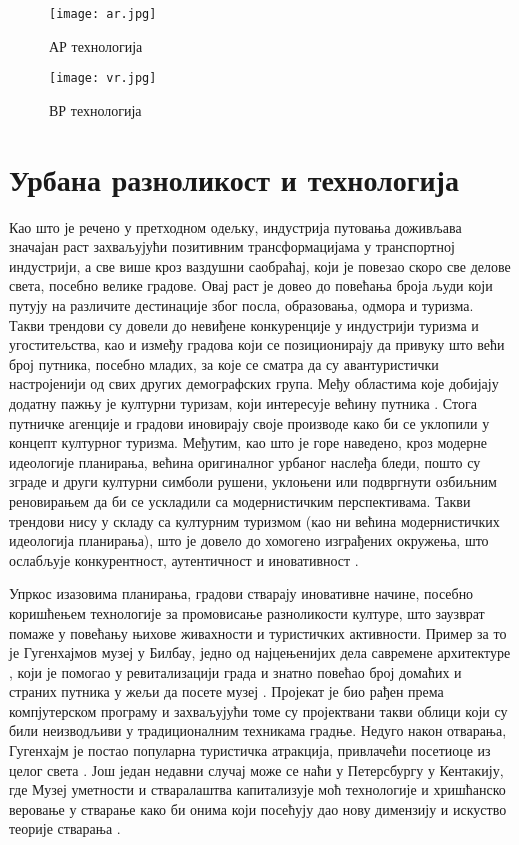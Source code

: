 \documentclass{article}
\begin{document}
\begin{figure}[H]
\centering
\texttt{[image: ar.jpg]}
\caption{АР технологија}
\end{figure}

\begin{figure}[H]
\centering
\texttt{[image: vr.jpg]}
\caption{ВР технологија}
\end{figure}

\section{Урбана разноликост и технологија}

Као што је речено у претходном одељку, индустрија путовања доживљава значајан раст захваљујући позитивним трансформацијама у транспортној индустрији, а све више кроз ваздушни саобраћај, који је повезао скоро све делове света, посебно велике градове. Овај раст је довео до повећања броја људи који путују на различите дестинације због посла, образовања, одмора и туризма. Такви трендови су довели до невиђене конкуренције у индустрији туризма и угоститељства, као и између градова који се позиционирају да привуку што већи број путника, посебно младих, за које се сматра да су авантуристички настројенији од свих других демографских група. Међу областима које добијају додатну пажњу је културни туризам, који интересује већину путника \cite{richardsg}. Стога путничке агенције и градови иновирају своје производе како би се уклопили у концепт културног туризма. Међутим, као што је горе наведено, кроз модерне идеологије планирања, већина оригиналног урбаног наслеђа бледи, пошто су зграде и други културни симболи рушени, уклоњени или подвргнути озбиљним реновирањем да би се ускладили са модернистичким перспективама. Такви трендови нису у складу са културним туризмом (као ни већина модернистичких идеологија планирања), што је довело до хомогено изграђених окружења, што ослабљује конкурентност, аутентичност и иновативност \cite{appendino}.

Упркос изазовима планирања, градови стварају иновативне начине, посебно коришћењем технологије за промовисање разноликости културе, што заузврат помаже у повећању њихове живахности и туристичких активности. Пример за то је Гугенхајмов музеј у Билбау, једно од најцењенијих дела савремене архитектуре \cite{archbilbao}, који је помогао у ревитализацији града и знатно повећао број домаћих и страних путника у жељи да посете музеј \cite{plazab}. Пројекат је био рађен према компјутерском програму и захваљујући томе су пројектвани такви облици који су били неизводљиви у традиционалним техникама градње. Недуго након отварања, Гугенхајм је постао популарна туристичка атракција, привлачећи посетиоце из целог света \cite{nytbilbao}. Још један недавни случај може се наћи у Петерсбургу у Кентакију, где Музеј уметности и стваралаштва капитализује моћ технологије и хришћанско веровање у стварање како би онима који посећују дао нову димензију и искуство теорије стварања \cite{hamk}.
\end{document}

